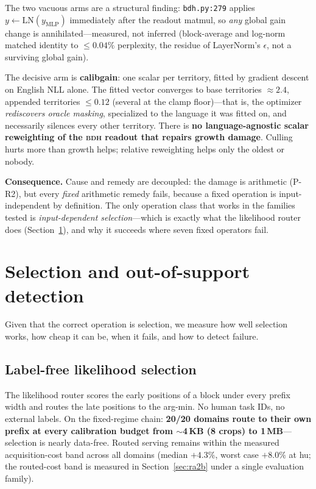 \documentclass[11pt]{article}
\theoremstyle{definition}\newtheorem{definition}{Definition}
\theoremstyle{remark}\newtheorem{remark}{Remark}
\newcommand{\BDH}{\textsc{bdh}}
\begin{document}
The two vacuous arms are a structural finding: \texttt{bdh.py:279} applies
$y \leftarrow \mathrm{LN}(y_{\mathrm{MLP}})$ immediately after the readout matmul, so
\emph{any} global gain change is annihilated---measured, not inferred (block-average and
log-norm matched identity to $\le0.04\%$ perplexity, the residue of LayerNorm's
$\epsilon$, not a surviving global gain).

The decisive arm is \textbf{calibgain}: one scalar per territory, fitted by gradient descent
on English NLL alone. The fitted vector converges to base territories $\approx 2.4$,
appended territories $\le 0.12$ (several at the clamp floor)---that is, the optimizer
\emph{rediscovers oracle masking}, specialized to the language it was fitted on, and
necessarily silences every other territory. There is \textbf{no language-agnostic scalar
reweighting of the \BDH{} readout that repairs growth damage}. Culling hurts more than
growth helps; relative reweighting helps only the oldest or nobody.

\textbf{Consequence.} Cause and remedy are decoupled: the damage is arithmetic
(P-R2), but every \emph{fixed} arithmetic remedy fails, because a fixed operation is
input-independent by definition. The only operation class that works in the families tested is
\emph{input-dependent selection}---which is exactly what the likelihood router does
(Section~\ref{sec:selection}), and why it succeeds where seven fixed operators fail.

\section{Selection and out-of-support detection}
\label{sec:selection}

Given that the correct operation is selection, we measure how well selection works, how
cheap it can be, when it fails, and how to detect failure.

\subsection{Label-free likelihood selection}

The likelihood router scores the early positions of a block under every prefix width and
routes the late positions to the arg-min. No human task IDs, no external labels. On the
fixed-regime chain: \textbf{20/20 domains route to their own prefix at every calibration
budget from $\sim$4\,KB (8 crops) to 1\,MB}---selection is nearly data-free. Routed
serving remains within the measured acquisition-cost band across all domains (median
$+4.3\%$, worst case $+8.0\%$ at hu; the routed-cost band is measured in
Section~\ref{sec:ra2b} under a single evaluation family).
\end{document}

